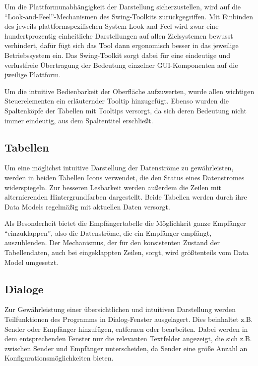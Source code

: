             Um die Plattformunabhängigkeit der Darstellung sicherzustellen, wird
            auf die ``Look-and-Feel''-Mechanismen des Swing-Toolkits
            zurückgegriffen. Mit Einbinden des jeweils plattformspezifischen
            System-Look-and-Feel wird zwar eine hundertprozentig einheitliche
            Darstellungen auf allen Zielsystemen bewusst verhindert, dafür fügt
            sich das Tool dann ergonomisch besser in das jeweilige
            Betriebssystem ein. Das Swing-Toolkit sorgt dabei für eine
            eindeutige und verlustfreie  Übertragung der Bedeutung einzelner
            GUI-Komponenten auf die jweilige Plattform.
            
            Um die intuitive Bedienbarkeit der Oberfläche aufzuwerten, wurde
            allen wichtigen Steuerelementen ein erläuternder Tooltip
            hinzugefügt. Ebenso wurden die Spaltenköpfe der Tabellen mit
            Tooltips versorgt, da sich deren Bedeutung nicht immer eindeutig,
            aus dem Spaltentitel erschließt.
        
        \subsection{Tabellen}
        
            Um eine möglichst intuitive Darstellung der Datenströme zu
            gewährleisten, werden in beiden Tabellen Icons verwendet, die den
            Status eines Datenstromes widerspiegeln. Zur besseren Lesbarkeit
            werden außerdem die Zeilen mit alternierenden Hintergrundfarben
            dargestellt. Beide Tabellen werden durch ihre Data Models regelmäßig
            mit aktuellen Daten versorgt.
            
            Als Besonderheit bietet die Empfängertabelle die Möglichkeit ganze
            Empfänger ``einzuklappen'', also die Datenströme, die ein Empfänger
            empfängt, auszublenden. Der Mechanismus, der für den konsistenten
            Zustand der Tabellendaten, auch bei eingeklappten Zeilen, sorgt,
            wird größtenteils vom Data Model umgesetzt. 
        
        \subsection{Dialoge}
        
        	Zur Gewährleistung einer übersichtlichen und intuitiven Darstellung
        	werden Teilfunktionen des Programms in Dialog-Fenster ausgelagert.
        	Dies beinhaltet z.B. Sender oder Empfänger hinzufügen, entfernen oder
        	bearbeiten.
        	Dabei werden in dem entsprechenden Fenster nur die relevanten
        	Textfelder angezeigt, die sich z.B. zwischen Sender und Empfänger
        	unterscheiden, da Sender eine größe Anzahl an
        	Konfigurationsmöglichkeiten bieten.
        	

